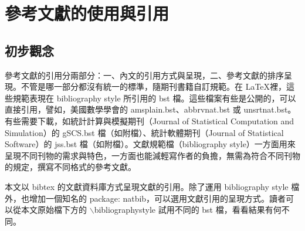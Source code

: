 %
%
\chapter{參考文獻的使用與引用}
\section{初步觀念}
參考文獻的引用分兩部分：一、內文的引用方式與呈現，二、參考文獻的排序呈現。不管是哪一部分都沒有統一的標準，隨期刊書籍自訂規範。在   \LaTeX 裡，這些規範表現在 bibliography style 所引用的 bst 檔。這些檔案有些是公開的，可以直接引用，譬如，美國數學學會的 amsplain.bst、abbrvnat.bst 或 unsrtnat.bst。有些需要下載，如統計計算與模擬期刊（Journal of Statistical Computation and Simulation）的 gSCS.bst 檔（如附檔）、統計軟體期刊（Journal of Statistical Software）的 jss.bst 檔（如附檔）。文獻規範檔（bibliography style）一方面用來呈現不同刊物的需求與特色，一方面也能減輕寫作者的負擔，無需為符合不同刊物的規定，撰寫不同格式的參考文獻。

本文以 bibtex 的文獻資料庫方式呈現文獻的引用。除了運用 bibliography style 檔外，也增加一個知名的 package: natbib，可以選用文獻引用的呈現方式。讀者可以從本文原始檔下方的 $\backslash$bibliographystyle  試用不同的 bst 檔，看看結果有何不同。


